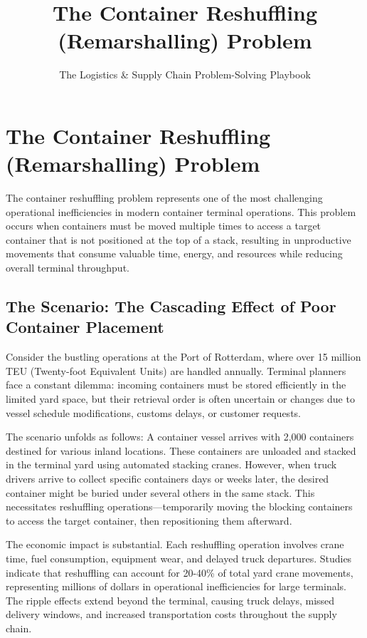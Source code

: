 \documentclass{article}
\title{The Container Reshuffling (Remarshalling) Problem}
\author{The Logistics \& Supply Chain Problem-Solving Playbook}
\date{}
\begin{document}
\maketitle

\section{The Container Reshuffling (Remarshalling) Problem}

The container reshuffling problem represents one of the most challenging operational inefficiencies in modern container terminal operations. This problem occurs when containers must be moved multiple times to access a target container that is not positioned at the top of a stack, resulting in unproductive movements that consume valuable time, energy, and resources while reducing overall terminal throughput.

\subsection{The Scenario: The Cascading Effect of Poor Container Placement}

Consider the bustling operations at the Port of Rotterdam, where over 15 million TEU (Twenty-foot Equivalent Units) are handled annually. Terminal planners face a constant dilemma: incoming containers must be stored efficiently in the limited yard space, but their retrieval order is often uncertain or changes due to vessel schedule modifications, customs delays, or customer requests.

The scenario unfolds as follows: A container vessel arrives with 2,000 containers destined for various inland locations. These containers are unloaded and stacked in the terminal yard using automated stacking cranes. However, when truck drivers arrive to collect specific containers days or weeks later, the desired container might be buried under several others in the same stack. This necessitates reshuffling operations—temporarily moving the blocking containers to access the target container, then repositioning them afterward.

The economic impact is substantial. Each reshuffling operation involves crane time, fuel consumption, equipment wear, and delayed truck departures. Studies indicate that reshuffling can account for 20-40\% of total yard crane movements, representing millions of dollars in operational inefficiencies for large terminals. The ripple effects extend beyond the terminal, causing truck delays, missed delivery windows, and increased transportation costs throughout the supply chain.
\end{document}
